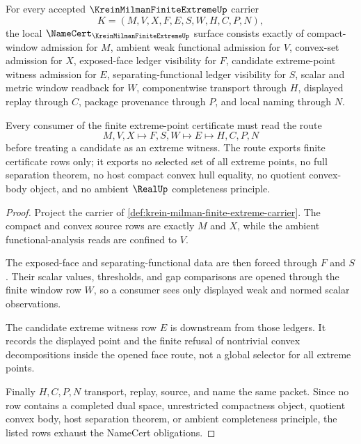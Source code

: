 \begin{theorem}
\label{thm:krein-milman-finite-extreme-namecert-obligations}
For every accepted $\KreinMilmanFiniteExtremeUp$ carrier
$$
K=(M,V,X,F,E,S,W,H,C,P,N),
$$
the local $\NameCert_{\KreinMilmanFiniteExtremeUp}$ surface consists exactly of compact-window admission for $M$, ambient weak functional admission for $V$, convex-set admission for $X$, exposed-face ledger visibility for $F$, candidate extreme-point witness admission for $E$, separating-functional ledger visibility for $S$, scalar and metric window readback for $W$, componentwise transport through $H$, displayed replay through $C$, package provenance through $P$, and local naming through $N$.

Every consumer of the finite extreme-point certificate must read the route
$$
M,V,X \longmapsto F,S,W \longmapsto E \longmapsto H,C,P,N
$$
before treating a candidate as an extreme witness. The route exports finite certificate rows only; it exports no selected set of all extreme points, no full separation theorem, no host compact convex hull equality, no quotient convex-body object, and no ambient $\RealUp$ completeness principle.
\end{theorem}
\begin{proof}
Project the carrier of \autoref{def:krein-milman-finite-extreme-carrier}. The compact and convex source rows are exactly $M$ and $X$, while the ambient functional-analysis reads are confined to $V$.

The exposed-face and separating-functional data are then forced through $F$ and $S$. Their scalar values, thresholds, and gap comparisons are opened through the finite window row $W$, so a consumer sees only displayed weak and normed scalar observations.

The candidate extreme witness row $E$ is downstream from those ledgers. It records the displayed point and the finite refusal of nontrivial convex decompositions inside the opened face route, not a global selector for all extreme points.

Finally $H,C,P,N$ transport, replay, source, and name the same packet. Since no row contains a completed dual space, unrestricted compactness object, quotient convex body, host separation theorem, or ambient completeness principle, the listed rows exhaust the NameCert obligations.
\end{proof}


